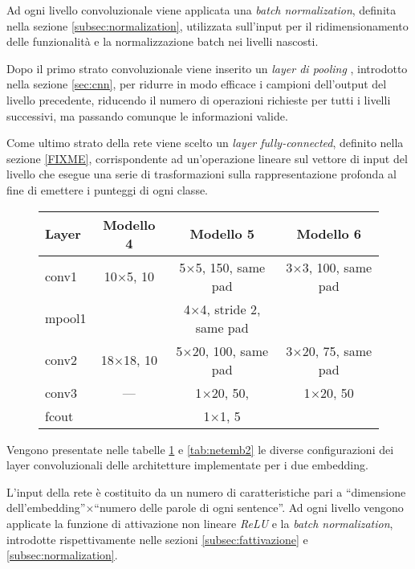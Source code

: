 Ad ogni livello convoluzionale viene applicata una \emph{batch normalization}, definita nella sezione \ref{subsec:normalization}, utilizzata sull'input per il ridimensionamento delle funzionalità e la normalizzazione batch nei livelli nascosti.

Dopo il primo strato convoluzionale viene inserito un \emph{layer di pooling} \cite{FIXME}, introdotto nella sezione \ref{sec:cnn}, per ridurre in modo efficace i campioni dell'output del livello precedente, riducendo il numero di operazioni richieste per tutti i livelli successivi, ma passando comunque le informazioni valide.

Come ultimo strato della rete viene scelto un \emph{layer fully-connected}, definito nella sezione \ref{FIXME}, corrispondente ad un'operazione lineare sul vettore di input del livello che esegue una serie di trasformazioni sulla rappresentazione profonda al fine di emettere i punteggi di ogni classe.

\begin{figure}[tb]
	\centering
	\begin{tabular}{lccc}
		\toprule
		\textbf{Layer}& \textbf{Modello 4} & \textbf{Modello 5} & \textbf{Modello 6} 		\\ 
		\midrule
		conv1 	& \num{10}$\times$\num{5}, 10	  & \num{5}$\times$\num{5}, 150, same pad    &\num{3}$\times$\num{3}, 100, same pad 		   \\
		
		mpool1 	& &{\num{4}$\times$\num{4}, stride 2, same pad}	&   \\
		conv2  	& \num{18}$\times$\num{18}, 10	  &  \num{5}$\times$\num{20}, 100, same pad	  &		\num{3}$\times$\num{20}, 75, same pad    \\
		conv3  	& ---	  & \num{1}$\times$\num{20}, 50, 	   &	\num{1}$\times$\num{20}, 50 	   \\
		fcout		& &{\num{1}$\times$\num{1}, 5}&		   \\
		
		\bottomrule	
	\end{tabular}
	\label{tab:netemb1}
\end{figure}

Vengono presentate nelle tabelle \ref{tab:netemb1} e \ref{tab:netemb2} le diverse configurazioni dei layer convoluzionali delle architetture implementate per i due embedding.

L'input della rete è costituito da un numero di caratteristiche pari a ``dimensione dell'embedding''$\times$``numero delle parole di ogni sentence''.
Ad ogni livello vengono applicate la funzione di attivazione non lineare \emph{ReLU} e la \emph{batch normalization}, introdotte rispettivamente nelle sezioni \ref{subsec:fattivazione} e \ref{subsec:normalization}.

